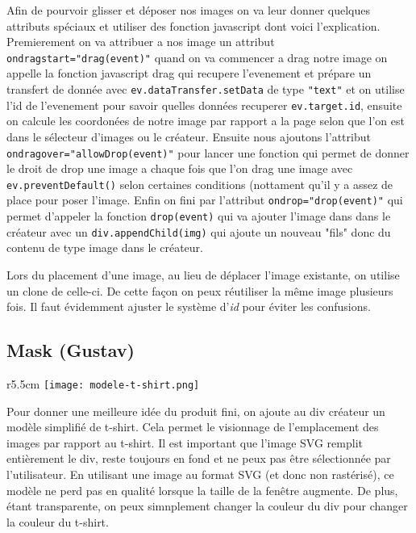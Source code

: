 \documentclass[french]{article}
\begin{document}
Afin de pourvoir glisser et déposer nos images on va leur donner quelques attributs spéciaux et utiliser des fonction javascript dont voici l'explication. \\
Premierement on va attribuer a nos image un attribut \verb|ondragstart="drag(event)"| quand on va commencer a drag notre image on appelle la fonction javascript drag qui recupere l'evenement et prépare un transfert de donnée avec \verb|ev.dataTransfer.setData| de type \verb|"text"| et on utilise l'id de l'evenement pour savoir quelles données recuperer \verb|ev.target.id|, ensuite on calcule les coordonées de notre image par rapport a la page selon que l'on est dans le sélecteur d'images ou le créateur. 
\newpage
Ensuite nous ajoutons l'attribut \verb|ondragover="allowDrop(event)"| pour lancer une fonction qui permet de donner le droit de drop une image a chaque fois que l'on drag une image avec \verb|ev.preventDefault()| selon certaines conditions (nottament qu'il y a assez de place pour poser l'image. Enfin on fini par l'attribut \verb|ondrop="drop(event)"| qui permet d'appeler la fonction \verb|drop(event)| qui va ajouter l'image dans  dans le créateur avec un \verb|div.appendChild(img)| qui ajoute un nouveau "fils" donc du contenu de type image dans le créateur.

Lors du placement d'une image, au lieu de d\'{e}placer l'image existante, on utilise un clone de celle-ci. De cette fa\c{c}on on peux r\'{e}utiliser la m\^{e}me image plusieurs fois. Il faut \'{e}videmment ajuster le syst\`{e}me d'\textit{id} pour \'{e}viter les confusions.

\subsection{Mask (Gustav)}

\begin{wrapfigure}{r}{5.5cm}
\texttt{[image: modele-t-shirt.png]}
\end{wrapfigure} 

Pour donner une meilleure id\'{e}e du produit fini, on ajoute au div créateur un mod\`{e}le simplifi\'{e} de t-shirt. Cela permet le visionnage de l'emplacement des images par rapport au t-shirt. Il est important que l'image SVG remplit entièrement le div, reste toujours en fond et ne peux pas être sélectionnée par l'utilisateur. En utilisant une image au format SVG (et donc non rast\'{e}ris\'{e}), ce mod\`{e}le ne perd pas en qualit\'{e} lorsque la taille de la fen\^{e}tre augmente. De plus, \'{e}tant transparente, on peux simnplement changer la couleur du div pour changer la couleur du t-shirt.
\end{document}

